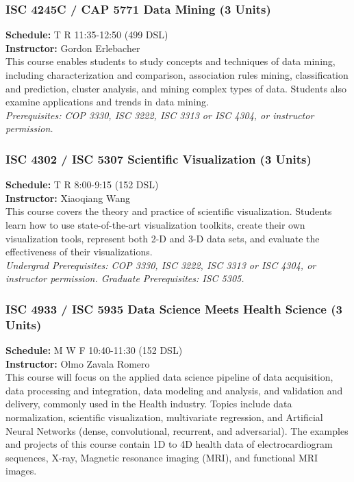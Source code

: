 \documentclass[12pt,a4paper]{article}
\begin{document}
\subsubsection*{ISC 4245C / CAP 5771 Data Mining (3 Units)}
\textbf{Schedule:} T R 11:35-12:50 (499 DSL) \\
\textbf{Instructor:} Gordon Erlebacher \\
This course enables students to study concepts and techniques of data mining, including characterization and comparison, association rules mining, classification and prediction, cluster analysis, and mining complex types of data. Students also examine applications and trends in data mining. \\
\textit{Prerequisites: COP 3330, ISC 3222, ISC 3313 or ISC 4304, or instructor permission.}

\subsubsection*{ISC 4302 / ISC 5307 Scientific Visualization (3 Units)}
\textbf{Schedule:} T R 8:00-9:15 (152 DSL) \\
\textbf{Instructor:} Xiaoqiang Wang \\
This course covers the theory and practice of scientific visualization. Students learn how to use state-of-the-art visualization toolkits, create their own visualization tools, represent both 2-D and 3-D data sets, and evaluate the effectiveness of their visualizations. \\
\textit{Undergrad Prerequisites: COP 3330, ISC 3222, ISC 3313 or ISC 4304, or instructor permission. Graduate Prerequisites: ISC 5305.}

\subsubsection*{ISC 4933 / ISC 5935 Data Science Meets Health Science (3 Units)}
\textbf{Schedule:} M W F 10:40-11:30 (152 DSL) \\
\textbf{Instructor:} Olmo Zavala Romero \\
This course will focus on the applied data science pipeline of data acquisition, data processing and integration, data modeling and analysis, and validation and delivery, commonly used in the Health industry. Topics include data normalization, scientific visualization, multivariate regression, and Artificial Neural Networks (dense, convolutional, recurrent, and adversarial). The examples and projects of this course contain 1D to 4D health data of electrocardiogram sequences, X-ray, Magnetic resonance imaging (MRI), and functional MRI images.
\end{document}
